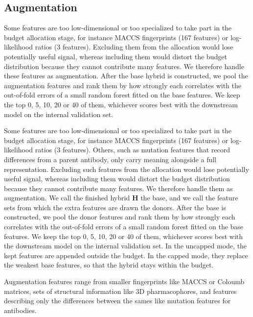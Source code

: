\subsection{Augmentation}

Some features are too low-dimensional or too specialized to take part in the budget allocation stage, for instance MACCS fingerprints (167 features) or log-likelihood ratios (3 features). Excluding them from the allocation would lose potentially useful signal, whereas including them would distort the budget distribution because they cannot contribute many features. We therefore handle these features as augmentation. After the base hybrid is constructed, we pool the augmentation features and rank them by how strongly each correlates with the out-of-fold errors of a small random forest fitted on the base features. We keep the top 0, 5, 10, 20 or 40 of them, whichever scores best with the downstream model on the internal validation set.

Some features are too low-dimensional or too specialized to take part in the budget allocation stage, for instance MACCS fingerprints (167 features) or log-likelihood ratios (3 features). Others, such as mutation features that record differences from a parent antibody, only carry meaning alongside a full representation. Excluding such features from the allocation would lose potentially useful signal, whereas including them would distort the budget distribution because they cannot contribute many features. We therefore handle them as augmentation. We call the finished hybrid $\mathbf{H}$ the base, and we call the feature sets from which the extra features are drawn the donors. After the base is constructed, we pool the donor features and rank them by how strongly each correlates with the out-of-fold errors of a small random forest fitted on the base features. We keep the top 0, 5, 10, 20 or 40 of them, whichever scores best with the downstream model on the internal validation set. In the uncapped mode, the kept features are appended outside the budget. In the capped mode, they replace the weakest base features, so that the hybrid stays within the budget.

Augmentation features range from smaller fingerprints like MACCS or Coloumb matrices, sets of structural information like 3D pharmacophores, and features describing only the differences between the sames like mutation features for antibodies.

